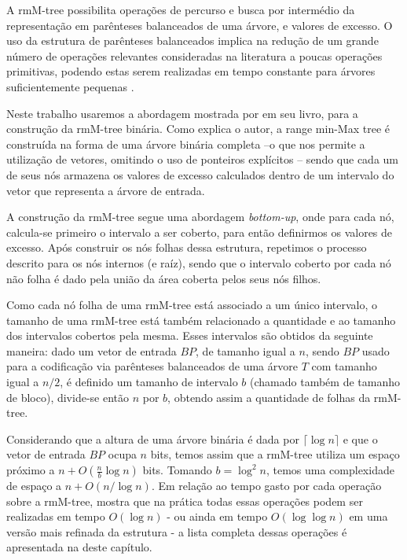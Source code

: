 A rmM-tree possibilita operações de percurso e busca por intermédio da representação em parênteses balanceados de uma árvore, e valores de excesso. O uso da estrutura de parênteses balanceados implica na redução de um grande número de operações relevantes consideradas na literatura a poucas operações primitivas, podendo estas serem realizadas em tempo constante para árvores suficientemente pequenas \citep{paper-fully-functinal-succint-trees}.

Neste trabalho usaremos a abordagem mostrada por \citet{book-compact-data-structures} em seu livro, para a construção da rmM-tree binária. Como explica o autor, a range min-Max tree é construída na forma de uma árvore binária completa --o que nos permite a utilização de vetores, omitindo o uso de ponteiros explícitos -- sendo que cada um de seus nós armazena os valores de excesso calculados dentro de um intervalo do vetor que representa a árvore de entrada. 

A construção da rmM-tree segue uma abordagem \textit{bottom-up}, onde para cada nó, calcula-se primeiro o intervalo a ser coberto, para então definirmos os  valores de excesso. Após construir os nós folhas dessa estrutura, repetimos o processo descrito para os nós internos (e raíz), sendo que o intervalo coberto por cada nó não folha é dado pela união da área coberta pelos seus nós filhos.

Como cada nó folha de uma rmM-tree está associado a um único intervalo, o tamanho de uma rmM-tree está também relacionado a quantidade e ao tamanho dos intervalos cobertos pela mesma. 
Esses intervalos são obtidos da seguinte maneira: dado um vetor de entrada $BP$, de  tamanho igual a $n$, sendo $BP$ usado para a codificação via parênteses balanceados de uma árvore $T$ com tamanho igual a $n/2$, é definido um tamanho de intervalo $b$ (chamado também de tamanho de bloco), divide-se então $n$ por $b$, obtendo assim a quantidade de folhas da rmM-tree.

Considerando que a altura de uma árvore binária é dada por $\lceil \log n \rceil$ e que o vetor de entrada $BP$ ocupa $n$ bits, temos assim que a rmM-tree utiliza um espaço próximo a $n + O(\frac{n}{b} \log n)$ bits. Tomando $b = \log^2 n$, temos uma complexidade de espaço a $n + O(n/\log n)$. Em relação ao tempo gasto por cada operação sobre a rmM-tree,  \citet{book-compact-data-structures} mostra que na prática todas essas operações podem ser realizadas em tempo $O(\log n)$ - ou ainda em tempo $O(\log \log n)$ em uma versão mais refinada da estrutura - a lista completa dessas operações é apresentada na  deste capítulo.

